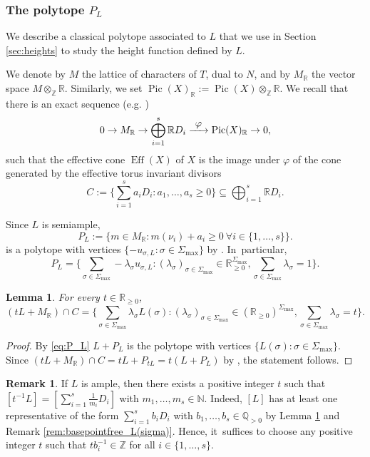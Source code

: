 \documentclass[11pt]{article}
\numberwithin{equation}{section}
\def\To#1{\mathchoice{\xrightarrow{\textstyle\kern4pt#1\kern3pt}}{\stackrel{#1}{\longrightarrow}}{}{}}
\newcommand\ZZ{\mathbb{Z}}
\newcommand\NN{\mathbb{N}}
\newcommand\RR{\mathbb{R}}
\newcommand\QQ{\mathbb{Q}}
\newcommand{\gen}[1]{\nu_{#1}}
\DeclareMathOperator{\pic}{Pic}
\DeclareMathOperator{\eff}{Eff}
\newtheorem{lemma}[theorem]{Lemma}
\theoremstyle{definition}
\newtheorem{remark}[theorem]{Remark}
\numberwithin{theorem}{section}
\begin{document}
\subsubsection{The polytope $P_L$}
We describe a classical polytope associated to $L$ that we use in
Section \ref{sec:heights} to study the height function defined by $L$.

We denote by $M$ the lattice of characters of $T$, dual to $N$,
and by $M_\RR$ the vector space $M\otimes_\ZZ \RR$.
Similarly, we set $\pic(X)_\RR:=\pic(X)\otimes_\ZZ\RR$.
We recall that there is an exact sequence (e.g. \cite[Th.\,4.2.1]{MR2810322})
\[
0
\to M_\RR
\to \bigoplus_{i=1}^s \RR D_i
\To{\varphi}\pic(X)_\RR
\to 0,
\]
such that the effective cone $\eff(X)$ of $X$ is the image under $\varphi$ of the cone generated by the
effective torus invariant divisors
\[
C:=\biggl \{\sum_{i=1}^s a_i D_i :
a_1,\dots, a_s\geq 0 \biggr \} \subseteq \bigoplus_{i=1}^s \RR D_i.
\]

Since $L$ is semiample,
\[
P_L:=\{m\in M_\RR: m(\gen{i})+a_i\geq 0\ \forall i\in\{1,\dots, s\}\}.
\]
is a polytope with vertices
$\{-u_{\sigma,L}:\sigma\in\Sigma_{\max}\}$
by \cite[Prop.\,4.3.8, Th.\,6.1.7]{MR2810322}. In~particular,
\begin{equation}
\label{eq:P_L}
P_L=\biggl\{\sum_{\sigma\in\Sigma_{\max}}-\lambda_\sigma u_{\sigma,L}:
(\lambda_\sigma)_{\sigma\in\Sigma_{\max}}\in\RR_{\geq0}^{\Sigma_{\max}},
\sum_{\sigma\in\Sigma_{\max}}\lambda_\sigma=1\biggr\}.
\end{equation}

\begin{lemma}
\label{lem:effective_cone}
For every $t\in\RR_{\geq0}$,
\[
(tL+M_\RR)\cap C=
\biggl \{\sum_{\sigma\in\Sigma_{\max}}\lambda_\sigma L(\sigma):
(\lambda_{\sigma})_{\sigma\in\Sigma_{\max}}\in (\RR_{\geq0})^{\Sigma_{\max}},
\sum_{\sigma\in\Sigma_{\max}}\lambda_{\sigma}=t \biggr \}.
\]
\end{lemma}
\begin{proof}
By \eqref{eq:P_L} $L+P_L$ is the polytope with vertices $\{L(\sigma):\sigma\in\Sigma_{\max}\}$.
Since $(tL+M_\RR)\cap C=tL+P_{tL}=t(L+P_L)$
by \cite[Exer.\,4.3.2]{MR2810322}, the statement follows.
\end{proof}

\begin{remark}
\label{rem:L_weights}
If $L$ is ample, then there exists a positive integer $t$
such that $[t^{-1}L]=\left [\sum_{i=1}^s\frac 1{m_i} D_i \right]$ with $m_1,\dots,m_s\in\NN$.
Indeed, $[L]$ has at least one representative of the form $\sum_{i=1}^sb_i D_i$
with $b_1,\dots,b_s\in \QQ_{>0}$ by Lemma \ref{lem:effective_cone}
and Remark \ref{rem:basepointfree_L(sigma)}.
Hence, it~suffices to choose any positive integer $t$ such that
$t b_i^{-1}\in\ZZ$ for all $i\in\{1,\dots,s\}$.
\end{remark}
\end{document}
